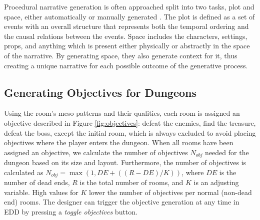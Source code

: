 Procedural narrative generation is often approached split into two tasks, plot and space, either automatically or manually generated . The plot is defined as a set of events with an overall structure that represents both the temporal ordering and the causal relations between the events. Space includes the characters, settings, props, and anything which is present either physically or abstractly in the space of the narrative. By generating space, they also generate context for it, thus creating a unique narrative for each possible outcome of the generative process.

\subsection{Generating Objectives for Dungeons} \label{sec:approach}

Using the room's meso patterns and their qualities, each room is assigned an objective described in Figure \ref{fig:objectives}: defeat the enemies, find the treasure, defeat the boss, except the initial room, which is always excluded to avoid placing objectives where the player enters the dungeon. When all rooms have been assigned an objective, we calculate the number of objectives $N_{obj}$ needed for the dungeon based on its size and layout. Furthermore, the number of objectives is calculated as $N_{obj} = \max(1, DE + ((R-DE)/K))$, where $DE$ is the number of dead ends, $R$ is the total number of rooms, and $K$ is an adjusting variable. High values for $K$ lower the number of objectives per normal (non-dead end) rooms. The designer can trigger the objective generation at any time in EDD by pressing a \textit{toggle objectives} button.%

